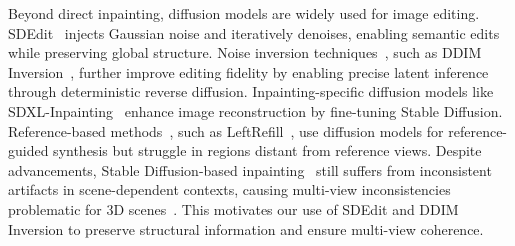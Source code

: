 \vspace{3pt}
Beyond direct inpainting, diffusion models are widely used for image editing. SDEdit~\citep{meng2022sdedit} injects Gaussian noise and iteratively denoises, enabling semantic edits while preserving global structure. Noise inversion techniques~\cite{mokady2022null, miyake2024negativepromptinversionfastimage}, such as DDIM Inversion~\citep{song2020denoising}, further improve editing fidelity by enabling precise latent inference through deterministic reverse diffusion.
Inpainting-specific diffusion models like SDXL-Inpainting~\cite{podell2023sdxlimprovinglatentdiffusion} enhance image reconstruction by fine-tuning Stable Diffusion. Reference-based methods~\cite{tang2023realfill}, such as LeftRefill~\citep{cao2024leftrefill}, use diffusion models for reference-guided synthesis but struggle in regions distant from reference views.
Despite advancements, Stable Diffusion-based inpainting~\cite{inpaint3d} still suffers from inconsistent artifacts in scene-dependent contexts, causing multi-view inconsistencies problematic for 3D scenes~\citep{li2023diffusion}. This motivates our use of SDEdit and DDIM Inversion to preserve structural information and ensure multi-view coherence.

